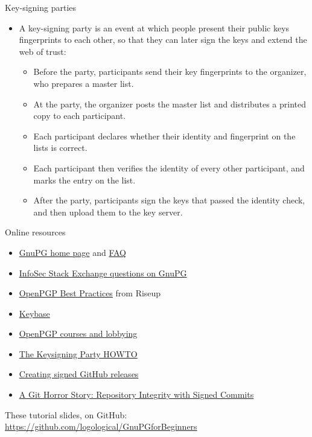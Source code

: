 \documentclass[
mode=present,
paper=smartboard,
size=20pt,
]{powerdot}
\begin{document}
\begin{slide}{Key-signing parties}
  \begin{itemize}
  \item A key-signing party is an event at which people present their
    public keys fingerprints to each other, so that they can later
    sign the keys and extend the web of trust:
    \begin{itemize}
    \item Before the party, participants send their key fingerprints
      to the organizer, who prepares a master list.
    \item At the party, the organizer posts the master list and
      distributes a printed copy to each participant.
    \item Each participant declares whether their identity and
      fingerprint on the lists is correct.
    \item Each participant then verifies the identity of every other
      participant, and marks the entry on the list.
    \item After the party, participants sign the keys that passed the
      identity check, and then upload them to the key server.
    \end{itemize}
  \end{itemize}
\end{slide}

\begin{slide}{Online resources}
  \begin{itemize}
  \item \href{https://gnupg.org/}{GnuPG home page} and \href{https://www.gnupg.org/faq/gnupg-faq.html}{FAQ}
  \item \href{http://security.stackexchange.com/questions/tagged/gnupg}{InfoSec Stack Exchange questions on GnuPG}
  \item \href{https://riseup.net/en/security/message-security/openpgp/best-practices}{OpenPGP Best Practices} from Riseup
  \item \href{https://keybase.io/}{Keybase}
  \item \href{http://www.openpgp-courses.org/}{OpenPGP courses and lobbying}
  \item \href{http://cryptnet.net/fdp/crypto/keysigning_party/en/keysigning_party.html}{The Keysigning Party HOWTO}
  \item
    \href{https://wiki.debian.org/Creating\%20signed\%20GitHub\%20releases}{Creating
      signed GitHub releases}
  \item \href{https://mikegerwitz.com/papers/git-horror-story}{A Git
      Horror Story: Repository Integrity with Signed Commits}
  \end{itemize}

  \centering
  These tutorial slides, on GitHub:\\
  \href{https://github.com/logological/GnuPGforBeginners}{https://github.com/logological/GnuPGforBeginners}

\end{slide}
\end{document}
